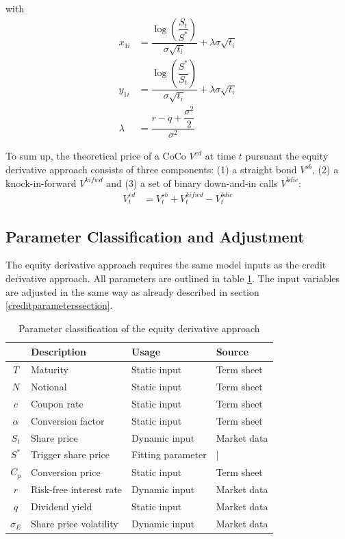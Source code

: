 with 
\begin{align*}
x_{1i} &= \dfrac{\log \left( \dfrac{S_t}{S^*} \right)}{\sigma \sqrt{t_i}} + \lambda \sigma \sqrt{t_i}\\
y_{1i} &= \dfrac{\log \left( \dfrac{S^*}{S_t} \right)}{\sigma \sqrt{t_i}} + \lambda \sigma \sqrt{t_i}\\
\lambda &= \dfrac{r-q+\dfrac{\sigma^2}{2}}{\sigma^2}
\end{align*}

To sum up, the theoretical price of a CoCo $V^{ed}$ at time $t$ pursuant the equity derivative approach consists of three components: (1) a straight bond $V^{sb}$, (2) a knock-in-forward $V^{kifwd}$ and (3) a set of binary down-and-in calls $V^{bdic}$:
\begin{align}
V^{ed}_t &= V^{sb}_t + V_t^{kifwd} - V_{t}^{bdic}
\end{align}

\subsection{Parameter Classification and Adjustment}

The equity derivative approach requires the same model inputs as the credit derivative approach. All parameters are outlined in table \ref{equityparameters}. The input variables are adjusted in the same way as already described in section \ref{creditparameterssection}.

\begin{table}[H]
 \setlength{\extrarowheight}{2.5pt}
 \centering
 \begin{tabular}{clll}
  \toprule
    & \textbf{Description} & \textbf{Usage} & \textbf{Source} \\ 
  \midrule
   $T$ & Maturity & Static input & Term sheet \\
   $N$ & Notional & Static input & Term sheet \\   
   $c$ & Coupon rate & Static input & Term sheet \\
   $\alpha$ & Conversion factor & Static input & Term sheet \\
   $S_t$ & Share price & Dynamic input & Market data \\
   $S^*$ & Trigger share price & Fitting parameter & | \\
   $C_p$ & Conversion price & Static input & Term sheet \\
   $r$ & Risk-free interest rate & Dynamic input & Market data \\
   $q$ & Dividend yield & Static input & Market data\\
   $\sigma_E$& Share price volatility & Dynamic input & Market data \\
  \bottomrule
 \end{tabular}
 \caption[Parameter classification of the equity derivative approach]{Parameter classification of the equity derivative approach \citep{wilkens2014contingent}}
 \label{equityparameters}
\end{table}

